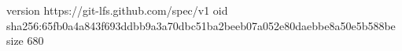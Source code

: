 version https://git-lfs.github.com/spec/v1
oid sha256:65fb0a4a843f693ddbb9a3a70dbc51ba2beeb07a052e80daebbe8a50e5b588be
size 680
